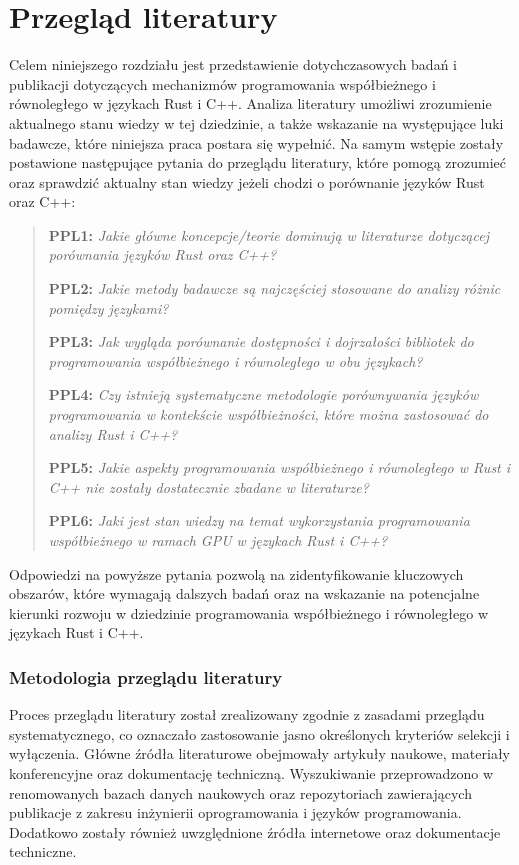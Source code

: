 \chapter{Przegląd literatury}
Celem niniejszego rozdziału jest przedstawienie dotychczasowych badań i publikacji dotyczących mechanizmów programowania współbieżnego i równoległego w językach Rust i C++. Analiza literatury umożliwi zrozumienie aktualnego stanu wiedzy w tej dziedzinie, a także wskazanie na występujące luki badawcze, które niniejsza praca postara się wypełnić.
Na samym wstępie zostały postawione następujące pytania do przeglądu literatury, które pomogą zrozumieć oraz sprawdzić aktualny stan wiedzy jeżeli chodzi o porównanie języków Rust oraz C++:

\begin{quote}
    \item \textbf{PPL1:} \emph{Jakie główne koncepcje/teorie dominują w literaturze dotyczącej porównania języków Rust oraz C++?} \label{PPL1}
    \item \textbf{PPL2:} \emph{Jakie metody badawcze są najczęściej stosowane do analizy różnic pomiędzy językami?}
    \item \textbf{PPL3:} \emph{Jak wygląda porównanie dostępności i dojrzałości bibliotek do programowania współbieżnego i równoległego w obu językach?}
    \item \textbf{PPL4:} \emph{Czy istnieją systematyczne metodologie porównywania języków programowania w kontekście współbieżności, które można zastosować do analizy Rust i C++?}
    \item \textbf{PPL5:} \emph{Jakie aspekty programowania współbieżnego i równoległego w Rust i C++ nie zostały dostatecznie zbadane w literaturze?}
    \item \textbf{PPL6:} \emph{Jaki jest stan wiedzy na temat wykorzystania programowania współbieżnego w ramach GPU w językach Rust i C++?}
\end{quote}

Odpowiedzi na powyższe pytania pozwolą na zidentyfikowanie kluczowych obszarów, które wymagają dalszych badań oraz na wskazanie na potencjalne kierunki rozwoju w dziedzinie programowania współbieżnego i równoległego w językach Rust i C++.
\subsection{Metodologia przeglądu literatury}
Proces przeglądu literatury został zrealizowany zgodnie z zasadami przeglądu systematycznego, co oznaczało zastosowanie jasno określonych kryteriów selekcji i wyłączenia. Główne źródła literaturowe obejmowały artykuły naukowe, materiały konferencyjne oraz dokumentację techniczną. Wyszukiwanie przeprowadzono w renomowanych bazach danych naukowych oraz repozytoriach zawierających publikacje z zakresu inżynierii oprogramowania i języków programowania. Dodatkowo zostały również uwzględnione źródła internetowe oraz dokumentacje techniczne.

